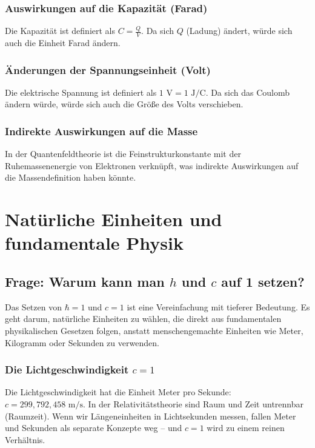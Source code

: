 \documentclass{article}
\begin{document}
	\subsubsection{Auswirkungen auf die Kapazität (Farad)}
	Die Kapazität ist definiert als $C = \frac{Q}{V}$. Da sich $Q$ (Ladung) ändert, würde sich auch die Einheit Farad ändern.
	
	\subsubsection{Änderungen der Spannungseinheit (Volt)}
	Die elektrische Spannung ist definiert als $1 \text{ V} = 1 \text{ J}/\text{C}$. Da sich das Coulomb ändern würde, würde sich auch die Größe des Volts verschieben.
	
	\subsubsection{Indirekte Auswirkungen auf die Masse}
	In der Quantenfeldtheorie ist die Feinstrukturkonstante mit der Ruhemassenenergie von Elektronen verknüpft, was indirekte Auswirkungen auf die Massendefinition haben könnte.
	
	\section{Natürliche Einheiten und fundamentale Physik}
	
	\subsection{Frage: Warum kann man $h$ und $c$ auf 1 setzen?}
	
	Das Setzen von $\hbar = 1$ und $c = 1$ ist eine Vereinfachung mit tieferer Bedeutung. Es geht darum, natürliche Einheiten zu wählen, die direkt aus fundamentalen physikalischen Gesetzen folgen, anstatt menschengemachte Einheiten wie Meter, Kilogramm oder Sekunden zu verwenden.
	
	\subsubsection{Die Lichtgeschwindigkeit $c = 1$}
	Die Lichtgeschwindigkeit hat die Einheit Meter pro Sekunde: $c = 299,792,458 \text{ m/s}$. In der Relativitätstheorie sind Raum und Zeit untrennbar (Raumzeit). Wenn wir Längeneinheiten in Lichtsekunden messen, fallen Meter und Sekunden als separate Konzepte weg – und $c = 1$ wird zu einem reinen Verhältnis.
	
\end{document}
